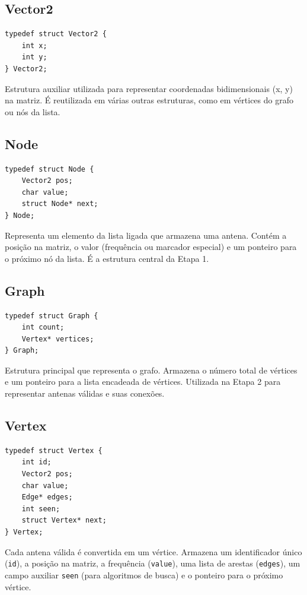 \documentclass[a4paper,12pt]{article}
\begin{document}
\subsection{Vector2}
\begin{lstlisting}[style=CStyle]
typedef struct Vector2 {
    int x;
    int y;
} Vector2;
\end{lstlisting}
Estrutura auxiliar utilizada para representar coordenadas bidimensionais (x, y) na matriz. É reutilizada em várias outras estruturas, como em vértices do grafo ou nós da lista.

\subsection{Node}
\begin{lstlisting}[style=CStyle]
typedef struct Node {
    Vector2 pos;
    char value;
    struct Node* next;
} Node;
\end{lstlisting}
Representa um elemento da lista ligada que armazena uma antena. Contém a posição na matriz, o valor (frequência ou marcador especial) e um ponteiro para o próximo nó da lista. É a estrutura central da Etapa 1.

\subsection{Graph}
\begin{lstlisting}[style=CStyle]
typedef struct Graph {
    int count;
    Vertex* vertices;
} Graph;
\end{lstlisting}
Estrutura principal que representa o grafo. Armazena o número total de vértices e um ponteiro para a lista encadeada de vértices. Utilizada na Etapa 2 para representar antenas válidas e suas conexões.

\subsection{Vertex}
\begin{lstlisting}[style=CStyle]
typedef struct Vertex {
    int id;
    Vector2 pos;
    char value;
    Edge* edges;
    int seen;
    struct Vertex* next;
} Vertex;
\end{lstlisting}
Cada antena válida é convertida em um vértice. Armazena um identificador único (\texttt{id}), a posição na matriz, a frequência (\texttt{value}), uma lista de arestas (\texttt{edges}), um campo auxiliar \texttt{seen} (para algoritmos de busca) e o ponteiro para o próximo vértice.
\end{document}
